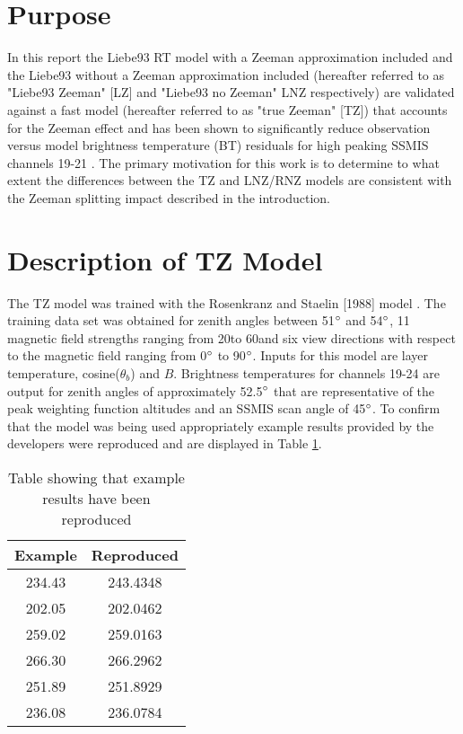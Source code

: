 \section{Purpose} 
In this report the Liebe93 RT model \cite{Liebe1993} with a Zeeman approximation included and the Liebe93 without a Zeeman approximation included (hereafter referred to as "Liebe93 Zeeman" [LZ] and "Liebe93 no Zeeman" LNZ respectively) \cite{Liebe1993} are validated against a fast model (hereafter referred to as "true Zeeman" [TZ]) that accounts for the Zeeman effect and has been shown to significantly reduce observation versus model brightness temperature (BT) residuals for high peaking SSMIS channels 19-21 \cite{Han2007}. The primary motivation for this work is to determine to what extent the differences between the TZ and LNZ/RNZ models are consistent with the Zeeman splitting impact described in the introduction.  


\section{Description of TZ Model}

The TZ model was trained with the Rosenkranz and Staelin [1988] model \cite{Rosenkranz1998}. The training data set was obtained for zenith angles between 51$^\circ$ and 54$^\circ$, 11 magnetic field strengths ranging from 20\microtesla to 60\microtesla and six view directions with respect to the magnetic field ranging from 0$^\circ$ to 90$^\circ$\cite{Han2007}. Inputs for this model are layer temperature, cosine($\theta_{b}$) and $B$. Brightness temperatures for channels 19-24 are output for zenith angles of approximately 52.5$^\circ$ that are representative of the peak weighting function altitudes and an SSMIS scan angle of 45$^\circ$. To confirm that the model was being used appropriately example results provided by the developers were reproduced and are displayed in Table \ref{tab:example_res}. 
\begin{table}[htp]
  \centering
  \begin{tabular}{c c}
    Example & Reproduced \\
    \hline 
    234.43 & 243.4348 \\
    202.05 & 202.0462 \\
    259.02 & 259.0163 \\
    266.30 & 266.2962 \\
    251.89 & 251.8929 \\
    236.08 & 236.0784 \\    
  \end{tabular}
  \caption{Table showing that example results have been reproduced}
  \label{tab:example_res}
\end{table}
 
